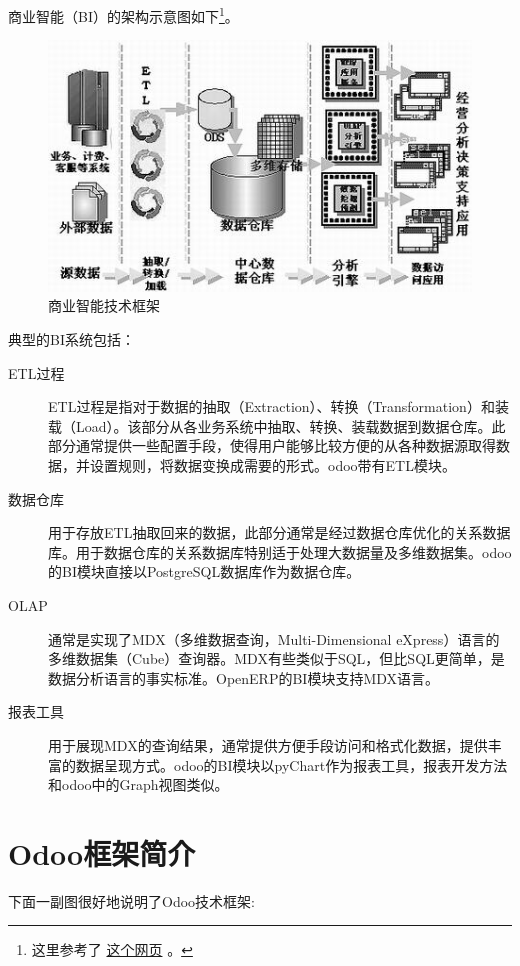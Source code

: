 \documentclass[11pt,a4paper]{sphinxmanual}
\begin{document}
商业智能（BI）的架构示意图如下\footnote{这里参考了 \href{http://shine-it.net/index.php?topic=2136.0}{这个网页} 。}。

\begin{figure}[H]
\centering
\includegraphics[keepaspectratio,max width=0.95\linewidth]{images/商业智能技术框架.png}
\caption{商业智能技术框架}
\end{figure}


典型的BI系统包括：

\begin{description}
\item[{ETL过程}] ETL过程是指对于数据的抽取（Extraction）、转换（Transformation）和装载（Load）。该部分从各业务系统中抽取、转换、装载数据到数据仓库。此部分通常提供一些配置手段，使得用户能够比较方便的从各种数据源取得数据，并设置规则，将数据变换成需要的形式。odoo带有ETL模块。

\item[{数据仓库}] 用于存放ETL抽取回来的数据，此部分通常是经过数据仓库优化的关系数据库。用于数据仓库的关系数据库特别适于处理大数据量及多维数据集。odoo的BI模块直接以PostgreSQL数据库作为数据仓库。

\item[{OLAP}] 通常是实现了MDX（多维数据查询，Multi-Dimensional eXpress）语言的多维数据集（Cube）查询器。MDX有些类似于SQL，但比SQL更简单，是数据分析语言的事实标准。OpenERP的BI模块支持MDX语言。

\item[{报表工具}] 用于展现MDX的查询结果，通常提供方便手段访问和格式化数据，提供丰富的数据呈现方式。odoo的BI模块以pyChart作为报表工具，报表开发方法和odoo中的Graph视图类似。
\end{description}



\chapter{Odoo框架简介}
\label{sec-2}
下面一副图很好地说明了Odoo技术框架:
\end{document}
